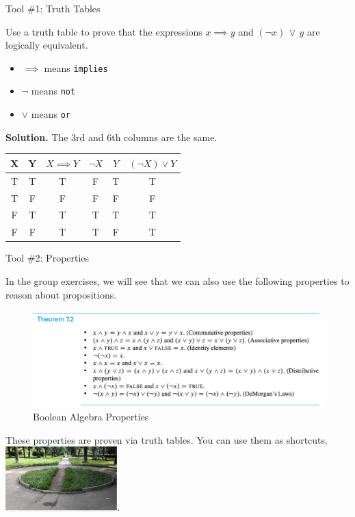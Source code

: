 \documentclass[10pt]{beamer}
\begin{document}
\begin{frame}{Tool \#1:  Truth Tables}
 \begin{mygreenbox}[title=Practice Reading Quiz (Sec. 7 - Boolean Algebra)]
Use a truth table to prove that the expressions $x \implies y$ and $(\lnot x) \, \lor \, y$ are logically equivalent.
\vfill 
\end{mygreenbox}
\vfill

\begin{myredbox}[title=Notation reminder]
\begin{itemize}
\item $\implies$ means \texttt{implies}
\item $\lnot$ means \texttt{not}
\item $\lor$ means \texttt{or} 	
\end{itemize}
\end{myredbox}
\vfill
\pause 
\colorbox{green!30}{\textbf{Solution.}}  The 3rd and 6th columns are the same.
\begin{center}
\begin{tabular}{ccc|ccc}
X & Y & $X \implies Y$ & $ \lnot X$  & $Y$   & $ (\lnot X) \lor Y$  \\
\hline 
T & T & T & F & T & T \\
T & F & F & F & F & F \\
F & T & T  &T &T & T \\
F & F & T  &T  &F & T \\
\end{tabular}
\end{center}	
\end{frame}


\begin{frame}{Tool \#2: Properties}
\footnotesize 


In the group exercises, we will see that we can also use the following properties to reason about propositions.
 
\vfill 
\begin{figure}[ht]
        \centering
        \includegraphics[width=\textwidth]{images/boolean_algebra_properties}
        \caption{Boolean Algebra Properties}
        \label{fig:bap}
\end{figure}
\vfill 
\pause 
These properties are proven via truth tables.   You can use them as \alert{shortcuts}.
\vspace{-.5cm}
\hfill \includegraphics[height=2.5cm]{images/shortcut}.
\end{frame}
\end{document}
